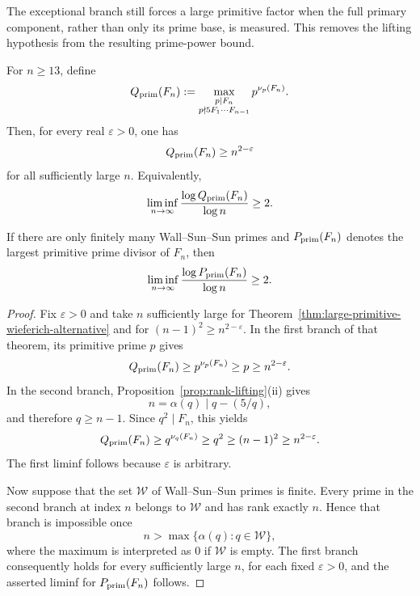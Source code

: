 The exceptional branch still forces a large primitive factor when the full
primary component, rather than only its prime base, is measured.  This
removes the lifting hypothesis from the resulting prime-power bound.

\begin{theorem}
\label{thm:primitive-primary-component}
For $n\geq13$, define
\[
 Q_{\rm prim}(F_n):=
 \max_{\substack{p\mid F_n\\p\nmid5F_1\cdots F_{n-1}}}
 p^{\nu_p(F_n)}.
\]
Then, for every real $\varepsilon>0$, one has
\[
 Q_{\rm prim}(F_n)\geq n^{2-\varepsilon}
\]
for all sufficiently large $n$.  Equivalently,
\[
 \liminf_{n\to\infty}
 \frac{\log Q_{\rm prim}(F_n)}{\log n}\geq2.
\]

If there are only finitely many Wall--Sun--Sun primes and
$P_{\rm prim}(F_n)$ denotes the largest primitive prime divisor of $F_n$,
then
\[
 \liminf_{n\to\infty}
 \frac{\log P_{\rm prim}(F_n)}{\log n}\geq2.
\]
\end{theorem}

\begin{proof}
Fix $\varepsilon>0$ and take $n$ sufficiently large for
Theorem~\ref{thm:large-primitive-wieferich-alternative} and for
$(n-1)^2\geq n^{2-\varepsilon}$.  In the first branch of that theorem, its
primitive prime $p$ gives
\[
 Q_{\rm prim}(F_n)\geq p^{\nu_p(F_n)}\geq p
 \geq n^{2-\varepsilon}.
\]
In the second branch, Proposition~\ref{prop:rank-lifting}\textup{(ii)} gives
\[
 n=\alpha(q)\mid q-(5/q),
\]
and therefore $q\geq n-1$.  Since $q^2\mid F_n$, this yields
\[
 Q_{\rm prim}(F_n)\geq q^{\nu_q(F_n)}
 \geq q^2\geq(n-1)^2\geq n^{2-\varepsilon}.
\]
The first liminf follows because $\varepsilon$ is arbitrary.

Now suppose that the set $\mathcal W$ of Wall--Sun--Sun primes is finite.
Every prime in the second branch at index $n$ belongs to $\mathcal W$ and
has rank exactly $n$.  Hence that branch is impossible once
\[
 n>\max\{\alpha(q):q\in\mathcal W\},
\]
where the maximum is interpreted as $0$ if $\mathcal W$ is empty.  The
first branch consequently holds for every sufficiently large $n$, for each
fixed $\varepsilon>0$, and the asserted liminf for
$P_{\rm prim}(F_n)$ follows.
\end{proof}
